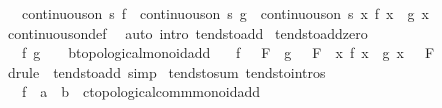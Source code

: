 \begin{isabellebody}
\ \ \ {\isachardoublequoteopen}continuous{\isacharunderscore}{\kern0pt}on\ s\ f\ {\isasymLongrightarrow}\ continuous{\isacharunderscore}{\kern0pt}on\ s\ g\ {\isasymLongrightarrow}\ continuous{\isacharunderscore}{\kern0pt}on\ s\ {\isacharparenleft}{\kern0pt}{\isasymlambda}x{\isachardot}{\kern0pt}\ f\ x\ {\isacharplus}{\kern0pt}\ g\ x{\isacharparenright}{\kern0pt}{\isachardoublequoteclose}\isanewline
%
\isadelimproof
\ \ %
\endisadelimproof
%
\isatagproof
{}\isamarkupfalse%
\ continuous{\isacharunderscore}{\kern0pt}on{\isacharunderscore}{\kern0pt}def\ \isamarkupfalse%
\ {\isacharparenleft}{\kern0pt}auto\ intro{\isacharcolon}{\kern0pt}\ tendsto{\isacharunderscore}{\kern0pt}add{\isacharparenright}{\kern0pt}%
\endisatagproof
{\isafoldproof}%
%
\isadelimproof
\isanewline
%
\endisadelimproof
\isanewline
{}\isamarkupfalse%
\ tendsto{\isacharunderscore}{\kern0pt}add{\isacharunderscore}{\kern0pt}zero{\isacharcolon}{\kern0pt}\isanewline
\ \ \ f\ g\ {\isacharcolon}{\kern0pt}{\isacharcolon}{\kern0pt}\ {\isachardoublequoteopen}{\isacharunderscore}{\kern0pt}\ {\isasymRightarrow}\ {\isacharprime}{\kern0pt}b{\isacharcolon}{\kern0pt}{\isacharcolon}{\kern0pt}topological{\isacharunderscore}{\kern0pt}monoid{\isacharunderscore}{\kern0pt}add{\isachardoublequoteclose}\isanewline
\ \ \ {\isachardoublequoteopen}{\isacharparenleft}{\kern0pt}f\ {\isasymlonglongrightarrow}\ {}{\isacharparenright}{\kern0pt}\ F\ {\isasymLongrightarrow}\ {\isacharparenleft}{\kern0pt}g\ {\isasymlonglongrightarrow}\ {}{\isacharparenright}{\kern0pt}\ F\ {\isasymLongrightarrow}\ {\isacharparenleft}{\kern0pt}{\isacharparenleft}{\kern0pt}{\isasymlambda}x{\isachardot}{\kern0pt}\ f\ x\ {\isacharplus}{\kern0pt}\ g\ x{\isacharparenright}{\kern0pt}\ {\isasymlonglongrightarrow}\ {}{\isacharparenright}{\kern0pt}\ F{\isachardoublequoteclose}\isanewline
%
\isadelimproof
\ \ %
\endisadelimproof
%
\isatagproof
{}\isamarkupfalse%
\ {\isacharparenleft}{\kern0pt}drule\ {\isacharparenleft}{\kern0pt}{}{\isacharparenright}{\kern0pt}\ tendsto{\isacharunderscore}{\kern0pt}add{\isacharparenright}{\kern0pt}\ simp%
\endisatagproof
{\isafoldproof}%
%
\isadelimproof
\isanewline
%
\endisadelimproof
\isanewline
{}\isamarkupfalse%
\ tendsto{\isacharunderscore}{\kern0pt}sum\ {\isacharbrackleft}{\kern0pt}tendsto{\isacharunderscore}{\kern0pt}intros{\isacharbrackright}{\kern0pt}{\isacharcolon}{\kern0pt}\isanewline
\ \ \ f\ {\isacharcolon}{\kern0pt}{\isacharcolon}{\kern0pt}\ {\isachardoublequoteopen}{\isacharprime}{\kern0pt}a\ {\isasymRightarrow}\ {\isacharprime}{\kern0pt}b\ {\isasymRightarrow}\ {\isacharprime}{\kern0pt}c{\isacharcolon}{\kern0pt}{\isacharcolon}{\kern0pt}topological{\isacharunderscore}{\kern0pt}comm{\isacharunderscore}{\kern0pt}monoid{\isacharunderscore}{\kern0pt}add{\isachardoublequoteclose}\isanewline

\end{isabellebody}
